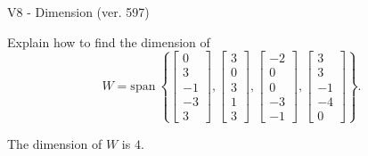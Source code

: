 \begin{exercise}
  \begin{exerciseTitle}V8 - Dimension (ver. 597)\end{exerciseTitle}
  \begin{exerciseStatement}
    Explain how to find the dimension of 
\[W=\mathrm{span}\ \left\{\left[\begin{array}{r}
0 \\
3 \\
-1 \\
-3 \\
3
\end{array}\right] , \left[\begin{array}{r}
3 \\
0 \\
3 \\
1 \\
3
\end{array}\right] , \left[\begin{array}{r}
-2 \\
0 \\
0 \\
-3 \\
-1
\end{array}\right] , \left[\begin{array}{r}
3 \\
3 \\
-1 \\
-4 \\
0
\end{array}\right]\right\}.\]



  \end{exerciseStatement}
  \begin{exerciseAnswer}
   The dimension of \(W\) is  \(4\).
  


  \end{exerciseAnswer}
\end{exercise}